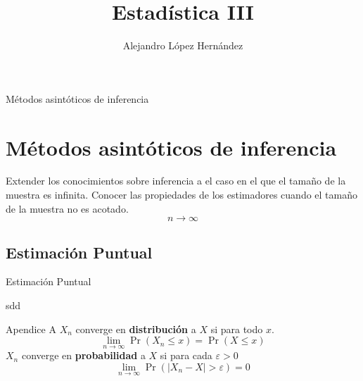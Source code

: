 \documentclass{beamer}
\author[Alejandro López]{Alejandro López Hernández}
\institute[FES Acatlán UNAM ]
{ FES Acatlán\\
  Universidad Nacional Autónoma de México }
\title{Estadística III}
\begin{document}
\frame{\titlepage}
\frame{\tableofcontents}
\begin{frame}{Métodos asintóticos de inferencia}
\section{Métodos asintóticos de inferencia}
Extender los conocimientos sobre inferencia a el caso en el que el tamaño de la muestra es infinita. Conocer las propiedades de los estimadores cuando el tamaño de la muestra no es acotado.$$n\rightarrow \infty$$
\end{frame}
\subsection{Estimación Puntual}
\begin{frame}{Estimación Puntual}

sdd
\end{frame}
\appendix
\begin{frame}{Apendice A} 
$X_n$ converge en \textbf{distribución} a $X$ si para todo $x$. $$\lim_{n\rightarrow \infty}\Pr(X_n\le x)=\Pr(X\le x)$$ $X_n$ converge en \textbf{probabilidad} a $X$ si para cada $\varepsilon>0$ $$\lim_{n\rightarrow \infty}\Pr(|X_n-X|>\varepsilon) =0$$
\end{frame}
\end{document}
